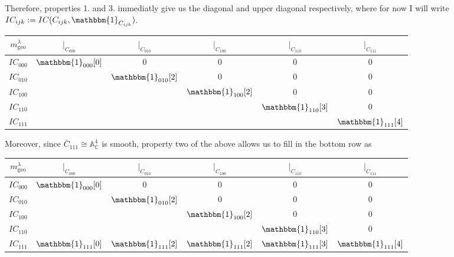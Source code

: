 \documentclass{memoir}
\newcommand{\ba}{\mathbb{A}}
\newcommand{\bc}{\mathbb{C}}
\newcommand{\tx}{\text}
\theoremstyle{definition}
\begin{document}
	Therefore, properties 1. and 3. immediatly give us the diagonal and upper diagonal respectively, where for now I will write $IC_{ijk}:=IC(C_{ijk}, \mathbbm{1}_{C_{ijk}})$.  
		\begin{center}
		\begin{tabular}{ c c c c c c}
			$m_{\tx{geo}}^\lambda$ & $|_{C_{000}}$ & $|_{C_{010}}$ & $|_{C_{100}}$ & $|_{C_{110}}$ & $|_{C_{111}}$ \\
			\hline 
			$IC_{000}$ & $\mathbbm{1}_{000}[0]$ & 0 & 0 & 0 & 0\\
			$IC_{010}$ &  & $\mathbbm{1}_{010}[2]$ & 0 & 0 & 0 \\
			$IC_{100}$ &  &  & $\mathbbm{1}_{100}[2]$ & 0 & 0 \\
			$IC_{110}$ &  &  &  & $\mathbbm{1}_{110}[3]$ & 0 \\
			$IC_{111}$ &  &  &   &   & $\mathbbm{1}_{111}[4]$ \\
		\end{tabular}
	\end{center}
	
	Moreover, since $\bar{C}_{111}\cong\ba_{\bc}^4$ is smooth, property two of the above allows us to fill in the bottom row as
	\begin{center}
		\begin{tabular}{ c c c c c c}
			$m_{\tx{geo}}^\lambda$ & $|_{C_{000}}$ & $|_{C_{010}}$ & $|_{C_{100}}$ & $|_{C_{110}}$ & $|_{C_{111}}$ \\
			\hline 
			$IC_{000}$ & $\mathbbm{1}_{000}[0]$ & 0 & 0 & 0 & 0\\
			$IC_{010}$ &  & $\mathbbm{1}_{010}[2]$ & 0 & 0 & 0 \\
			$IC_{100}$ &  &  & $\mathbbm{1}_{100}[2]$ & 0 & 0 \\
			$IC_{110}$ &  &  &  & $\mathbbm{1}_{110}[3]$ & 0 \\
			$IC_{111}$ & $\mathbbm{1}_{111}[0]$ & $\mathbbm{1}_{111}[2]$ & $\mathbbm{1}_{111}[2]$ & $\mathbbm{1}_{111}[3]$ & $\mathbbm{1}_{111}[4]$ \\
		\end{tabular}
	\end{center}
	
\end{document}
